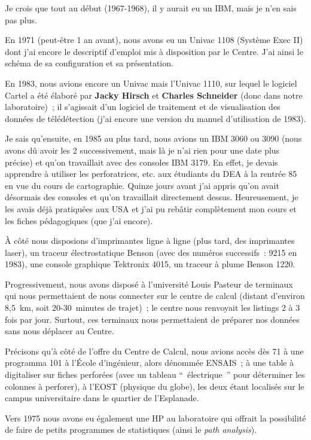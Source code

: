 Je crois que tout au début (1967-1968), il y aurait eu un IBM, mais je n’en sais pas plus.

En 1971 (peut-être 1 an avant), nous avons eu un Univac 1108 (Système Exec II) dont j’ai encore le descriptif d’emploi mis à disposition par le Centre. J’ai ainsi le schéma de sa configuration et sa présentation.

En 1983, nous avions encore un Univac mais l’Univac 1110, sur lequel le logiciel Cartel a été élaboré par \textbf{Jacky Hirsch} et \textbf{Charles Schneider} (donc dans notre laboratoire) ; il s’agissait d’un logiciel de traitement et de visualisation des données de télédétection (j’ai encore une version du manuel d’utilisation de 1983).

Je sais qu’ensuite, en 1985 au plus tard, nous avions un IBM 3060 ou 3090 (nous avons dû avoir les 2 successivement, mais là je n’ai rien pour une date plus précise) et qu’on travaillait avec des consoles IBM 3179. En effet, je devais apprendre à utiliser les perforatrices, etc. aux étudiants du DEA à la rentrée 85 en vue du cours de cartographie. Quinze jours avant j’ai appris qu’on avait désormais des consoles et qu’on travaillait directement dessus. Heureusement, je les avais déjà pratiquées aux USA et j’ai pu rebâtir complètement mon cours et les fiches pédagogiques (que j’ai encore).

À côté nous disposions d’imprimantes ligne à ligne (plus tard, des imprimantes laser), un traceur électrostatique Benson (avec des numéros successifs : 9215 en 1983), une console graphique Tektronix 4015, un traceur à plume Benson 1220.

Progressivement, nous avons disposé à l’université Louis Pasteur de terminaux qui nous permettaient de nous connecter sur le centre de calcul (distant d’environ 8,5 km, soit 20-30 minutes de trajet) ; le centre nous renvoyait les listings 2 à 3 fois par jour. Surtout, ces terminaux nous permettaient de préparer nos données sans nous déplacer au Centre.

Précisons qu’à côté de l’offre du Centre de Calcul, nous avions accès dès 71 à une programma 101 à l’École d’ingénieur, alors dénommée ENSAIS ; à une table à digitaliser sur fiches perforées (avec un tableau \enquote{ électrique } pour déterminer les colonnes à perforer), à l’EOST (physique du globe), les deux étant localisés sur le campus universitaire dans le quartier de l’Esplanade.

Vers 1975 nous avons eu également une HP au laboratoire qui offrait la possibilité de faire de petits programmes de statistiques (ainsi le \textit{path analysis}).

